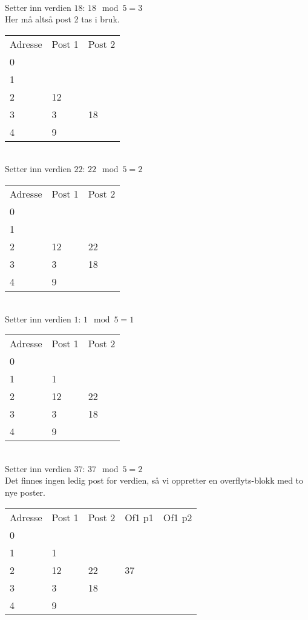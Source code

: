 \documentclass[a4paper, 12pt] {article}
\begin{document}
~\\
Setter inn verdien $18$: $18 \mod 5 = 3$\\
Her må altså post 2 tas i bruk.\\
\begin{tabular}{|l|l|l|}
    \hline
    Adresse & Post 1 & Post 2 \\
    0       & ~      & ~      \\
    1       & ~      & ~      \\
    2       & 12     & ~      \\
    3       & 3      & 18      \\
    4       & 9      & ~      \\ \hline
\end{tabular}

~\\
Setter inn verdien $22$: $22 \mod 5 = 2$\\
\begin{tabular}{|l|l|l|}
    \hline
    Adresse & Post 1 & Post 2 \\
    0       & ~      & ~      \\
    1       & ~      & ~      \\
    2       & 12     & 22     \\
    3       & 3      & 18     \\
    4       & 9      & ~      \\ \hline
\end{tabular}

~\\
Setter inn verdien $1$: $1 \mod 5 = 1$\\
\begin{tabular}{|l|l|l|}
    \hline
    Adresse & Post 1 & Post 2 \\
    0       & ~      & ~      \\
    1       & 1      & ~      \\
    2       & 12     & 22     \\
    3       & 3      & 18     \\
    4       & 9      & ~      \\ \hline
\end{tabular}

~\\
Setter inn verdien $37$: $37 \mod 5 = 2$\\
Det finnes ingen ledig post for verdien, så vi oppretter en overflyts-blokk med to nye poster.\\
\begin{tabular}{|l|l|l|l|l|}
    \hline
    Adresse & Post 1 & Post 2 & Of1 p1 & Of1 p2 \\
    0       & ~      & ~      & ~      & ~      \\
    1       & 1      & ~      & ~      & ~      \\
    2       & 12     & 22     & 37     & ~      \\
    3       & 3      & 18     & ~      & ~      \\
    4       & 9      & ~      & ~      & ~      \\ \hline
\end{tabular}
\end{document}
